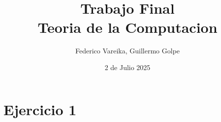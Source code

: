 \documentclass[12pt, a4paper]{article}
\title{
    {Trabajo Final}\\
    {\large Teoria de la Computacion}
}
\author{Federico Vareika, Guillermo Golpe}
\date{2 de Julio 2025}
\begin{document}
\maketitle

\newpage

\section*{Ejercicio 1}
\setcounter{section}{1}



\newpage
\printbibliography
\end{document}
